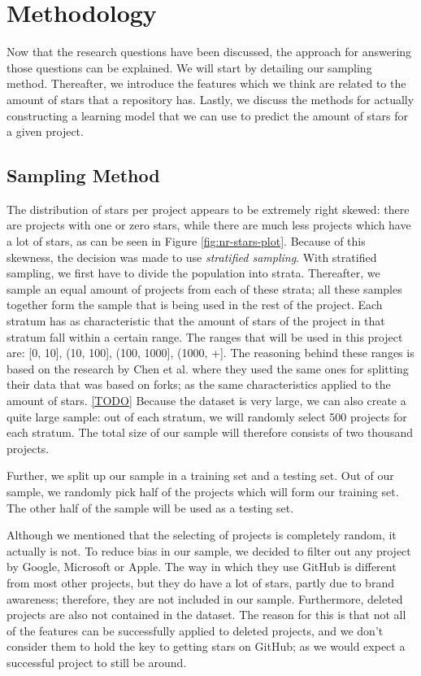 \section{Methodology}
    Now that the research questions have been discussed, the approach for answering those questions can be explained.
    We will start by detailing our sampling method. 
    Thereafter, we introduce the features which we think are related to the amount of stars that a repository has.
    Lastly, we discuss the methods for actually constructing a learning model that we can use to predict the amount of stars for a given project.
    \subsection{Sampling Method}
        The distribution of stars per project appears to be extremely right skewed: there are projects with one or zero stars, while there are much less projects which have a lot of stars, as can be seen in Figure \ref{fig:nr-stars-plot}.
        Because of this skewness, the decision was made to use \textit{stratified sampling}\cite{TODO}.
        With stratified sampling, we first have to divide the population into strata. 
        Thereafter, we sample an equal amount of projects from each of these strata; 
        all these samples together form the sample that is being used in the rest of the project.
        Each stratum has as characteristic that the amount of stars of the project in that stratum fall within a certain range. 
        The ranges that will be used in this project are: [0, 10], (10, 100], (100, 1000], (1000, +].
        The reasoning behind these ranges is based on the research by Chen et al. where they used the same ones for splitting their data that was based on forks; as the same characteristics applied to the amount of stars. \ref{TODO}
        Because the dataset is very large, we can also create a quite large sample:         
        out of each stratum, we will randomly select 500 projects for each stratum. The total size of our sample will therefore consists of two thousand projects.
        
        Further, we split up our sample in a training set and a testing set. Out of our sample, we randomly pick half of the projects which will form our training set. The other half of the sample will be used as a testing set.
        
        Although we mentioned that the selecting of projects is completely random, it actually is not. To reduce bias in our sample, we decided to filter out any project by Google, Microsoft or Apple.
        The way in which they use GitHub is different from most other projects, but they do have a lot of stars, partly due to brand awareness;  therefore, they are not included in our sample.
        Furthermore, deleted projects are also not contained in the dataset.
        The reason for this is that not all of the features can be successfully applied to deleted projects, and we don't consider them to hold the key to getting stars on GitHub; as we would expect a successful project to still be around.
        
